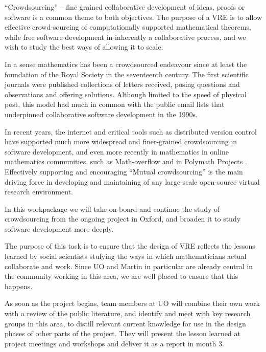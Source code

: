 \begin{workpackage}[id=social-aspects,wphases=0-48,
  title=Social Aspects,
  lead=UO,
  UORM=23,USHRM=8,USORM=6]
\begin{wpdescription}


``Crowdsourcing'' -- fine grained collaborative development of ideas,
  proofs or software is a common theme to both objectives. The purpose
  of a VRE is to allow effective crowd-sourcing of computationally
  supported mathematical theorems, while free software development in
  inherently a collaborative process, and we wish to study the best
  ways of allowing it to scale.

In a sense mathematics has been a crowdsourced endeavour since at
least the foundation of the Royal Society in the seventeenth century. 
The first scientific journals were published collections of letters
received, posing questions and observations and offering solutions. 
Although limited to the speed of physical post, this model had much in
common with the public email lists that underpinned collaborative
software development in the 1990s.

In recent years, the internet and critical tools such as distributed
version control have supported much more widespread and finer-grained
crowdsourcing in software development, and even more recently in
mathematics in online mathematics communities, such as Math-overflow
\cite{mathoverflow} and in Polymath Projects \cite{polymath_SIAM,
  PolymathBlog}.  Effectively supporting and encouraging ``Mutual
crowdsourcing'' is the main driving force in developing and
maintaining of any large-scale open-source virtual research
environment.

In this workpackage we will take on board and continue the study of
crowdsourcing from the ongoing project in Oxford, and broaden it to
study software development more deeply.

\end{wpdescription}

\begin{tasklist}
\begin{task}[title=Social Science Input to
    Design,id=social-input,lead=UO,PM=8, partners={UO,PS}]
The purpose of this task is to ensure that the design of \TheProject
VRE reflects the lessons learned by social scientists stufying the
ways in which mathematicians actual collaborate and work. Since UO and
Martin in particular are already central in the community
working in this area, we are well placed to ensure that this happens. 

As soon as the project begins, team members at UO will combine their
own work with a review of the public literature, and identify and
meet with key research groups in this area, to distill relevant
current knowledge for use in the design phases of other parts of the
project. They will  present the lesson
learned at project meetings and workshops and deliver it as a report
 in month 3.


\end{task}
\end{tasklist}
\end{workpackage}
